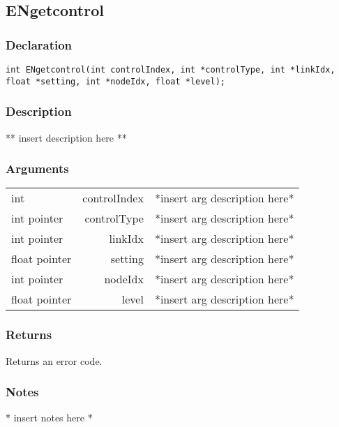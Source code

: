 \subsection{ENgetcontrol}
\subsubsection{Declaration}
\begin{lstlisting}
int ENgetcontrol(int controlIndex, int *controlType, int *linkIdx, float *setting, int *nodeIdx, float *level);
\end{lstlisting}
\subsubsection{Description}
** insert description here **
\subsubsection{Arguments}
\begin{tabular}{l r p{11cm} }
int&controlIndex&*insert arg description here* \\[6pt]
int pointer&controlType&*insert arg description here* \\[6pt]
int pointer&linkIdx&*insert arg description here* \\[6pt]
float pointer&setting&*insert arg description here* \\[6pt]
int pointer&nodeIdx&*insert arg description here* \\[6pt]
float pointer&level&*insert arg description here* \\[6pt]
\end{tabular}
\subsubsection{Returns}
Returns an error code.
\subsubsection{Notes}
* insert notes here *